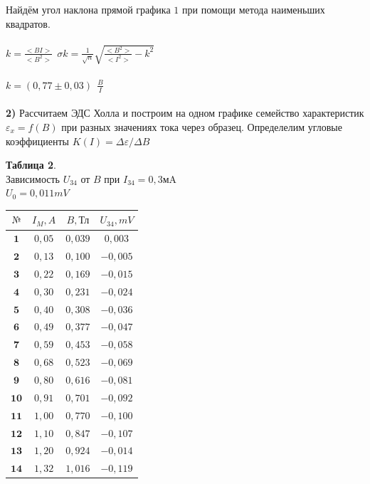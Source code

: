 \documentclass[11pt,a4paper]{article}
\begin{document}
Найдём угол наклона прямой графика $1$ при помощи метода наименьших квадратов.
\\\\
$k = \frac{<BI>}{<B^2>} \ \ \sigma k =\frac{1}{\sqrt{n}} \sqrt{\frac{<B^2>}{<I^2>} - k^2}$ \\\\
$\boxed{k=(0,77 \pm 0,03) \ \ \frac{B}{I}}$
\\\\
\textbf {2)} Рассчитаем ЭДС Холла и построим на одном графике семейство характеристик $\varepsilon_x = f(B)$ при разных значениях тока через образец. Определелим угловые коэффициенты $K(I) = \Delta \varepsilon / \Delta B$
\begin{paracol}{2}
	\begin{table}[h!]
	\begin{center}
		\textbf{Таблица 2}. \\ Зависимость $U_{34}$ от $B$ при $I_{34} = 0,3 \text{мA}$
		\\
		$U_0 = 0,011 mV$
		\\
		\begin{tabular}{|c|c|c|c|}
			\hline
			$\text{№}$  & $I_M,A$ & $B,\text{Тл}$ & $U_{34},mV$ \\ \hline
			$\textbf{1}$ & $0,05$ & $0,039$  & $0,003$ \\ \hline
			$\textbf{2}$ & $0,13$ & $0,100$  & $-0,005$ \\ \hline
			$\textbf{3}$ & $0,22$ & $0,169$  & $-0,015$ \\ \hline
			$\textbf{4}$ & $0,30$ & $0,231$  & $-0,024$ \\ \hline
			$\textbf{5}$ & $0,40$ & $0,308$  & $-0,036$ \\ \hline
			$\textbf{6}$ & $0,49$ & $0,377$  & $-0,047$ \\ \hline
			$\textbf{7}$ & $0,59$ & $0,453$  & $-0,058$ \\ \hline
			$\textbf{8}$ & $0,68$ & $0,523$  & $-0,069$ \\ \hline
			$\textbf{9}$ & $0,80$ & $0,616$  & $-0,081$ \\ \hline
			$\textbf{10}$ & $0,91$ & $0,701$  & $-0,092$ \\ \hline
			$\textbf{11}$ & $1,00$ & $0,770$  & $-0,100$ \\ \hline
			$\textbf{12}$ & $1,10$ & $0,847$  & $-0,107$ \\ \hline
			$\textbf{13}$ & $1,20$ & $0,924$  & $-0,014$ \\ \hline
			$\textbf{14}$ & $1,32$ & $1,016$  & $-0,119$ \\ \hline

\end{tabular}
\end{center}
\end{table}
\end{paracol}
\end{document}
